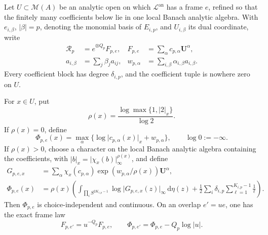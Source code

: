 \begin{theorem}
Let \(U\subset\mathcal M(A)\) be an analytic open on which
\(\mathscr L^{\mathrm{an}}\) has a frame \(e\), refined so that the finitely
many coefficients below lie in one local Banach analytic algebra.  With
\(e_{i,\beta}\), \(\lvert\beta\rvert=p\), denoting the monomial basis of
\(E_{i,p}\), and \(U_{i,\beta}\) its dual coordinate, write
\begin{align}
 \mathcal R_p&=e^{\otimes Q_p}F_{p,e},&
 F_{p,e}&=\sum_\alpha c_{p,\alpha}\mathbf U^\alpha,
 \label{eq:p171-module-c-local-polynomial}\\
 a_{i,\beta}&=\sum_j\beta_ja_{ij},&
 w_{p,\alpha}&=\sum_{i,\beta}\alpha_{i,\beta}a_{i,\beta}.
 \label{eq:p171-module-c-monomial-weights}
\end{align}
Every coefficient block has degree \(\delta_{i,p}\), and the coefficient
tuple is nowhere zero on \(U\).

For \(x\in U\), put
\begin{equation}
 \rho(x)=\frac{\log\max\{1,\lvert2\rvert_x\}}{\log2}.
 \label{eq:p171-module-c-rho}
\end{equation}
If \(\rho(x)=0\), define
\begin{equation}
 \Phi_{p,e}(x)=\max_\alpha
 \{\log\lvert c_{p,\alpha}(x)\rvert_x+w_{p,\alpha}\},
 \qquad \log0:=-\infty.
 \label{eq:p171-module-c-phi-na}
\end{equation}
If \(\rho(x)>0\), choose a character on the local Banach analytic algebra
containing the coefficients, with
\(\lvert b\rvert_x=\lvert\chi_x(b)\rvert_\infty^{\rho(x)}\), and define
\begin{align}
 G_{p,e,x}
 &=\sum_\alpha\chi_x(c_{p,\alpha})
   \exp(w_{p,\alpha}/\rho(x))\mathbf U^\alpha,
 \label{eq:p171-module-c-arch-polynomial}\\
 \Phi_{p,e}(x)
 &=\rho(x)\left(
 \int_{\prod_iS^{2K_{i,p}-1}}\log\lvert G_{p,e,x}(z)\rvert_
 \infty\,\mathrm d\eta(z)
 +\frac12\sum_i\delta_{i,p}
       \sum_{\ell=1}^{K_{i,p}-1}\frac1\ell\right).
 \label{eq:p171-module-c-phi-arch}
\end{align}
Then \(\Phi_{p,e}\) is choice-independent and continuous.  On an overlap
\(e'=ue\), one has the exact frame law
\begin{equation}
 F_{p,e'}=u^{-Q_p}F_{p,e},\qquad
 \Phi_{p,e'}=\Phi_{p,e}-Q_p\log\lvert u\rvert.
 \label{eq:p171-module-c-frame-law}
\end{equation}


\end{theorem}
